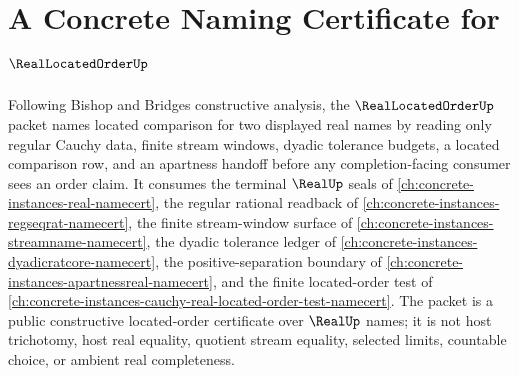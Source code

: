 \chapter{A Concrete Naming Certificate for $\RealLocatedOrderUp$}
\label{ch:concrete-instances-real-located-order-namecert}

Following Bishop and Bridges constructive analysis, the $\RealLocatedOrderUp$ packet names located comparison for two displayed real names by reading only regular Cauchy data, finite stream windows, dyadic tolerance budgets, a located comparison row, and an apartness handoff before any completion-facing consumer sees an order claim. It consumes the terminal $\RealUp$ seals of \autoref{ch:concrete-instances-real-namecert}, the regular rational readback of \autoref{ch:concrete-instances-regseqrat-namecert}, the finite stream-window surface of \autoref{ch:concrete-instances-streamname-namecert}, the dyadic tolerance ledger of \autoref{ch:concrete-instances-dyadicratcore-namecert}, the positive-separation boundary of \autoref{ch:concrete-instances-apartnessreal-namecert}, and the finite located-order test of \autoref{ch:concrete-instances-cauchy-real-located-order-test-namecert}. The packet is a public constructive located-order certificate over $\RealUp$ names; it is not host trichotomy, host real equality, quotient stream equality, selected limits, countable choice, or ambient real completeness.

